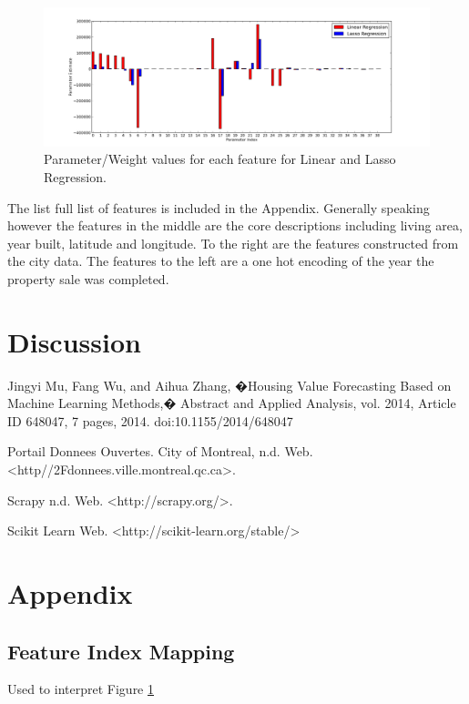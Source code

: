 \documentclass{acm_proc_article-sp}
\begin{document}
	 \begin{figure}[!htbp]
   		\centering
  		\includegraphics[width=\textwidth]{parameter_values.png}
    		\caption{Parameter/Weight values for each feature for Linear and Lasso Regression.}
    		\label{fig:feats}
	\end{figure}
	
	The list full list of features is included in the Appendix. Generally speaking however the features in the middle are the core descriptions including living area, year built, latitude and longitude. To the right are the features constructed from the city data. The features to the left are a one hot encoding of the year the property sale was completed.

\section{Discussion}

\begin{thebibliography}{9}

  Jingyi Mu, Fang Wu, and Aihua Zhang, �Housing Value Forecasting Based on Machine Learning Methods,� Abstract and Applied Analysis, vol. 2014, Article ID 648047, 7 pages, 2014. doi:10.1155/2014/648047
  
	Portail Donnees Ouvertes. City of Montreal, n.d. Web. <http//2Fdonnees.ville.montreal.qc.ca>.
	
	Scrapy n.d. Web. <http://scrapy.org/>.
	
 	Scikit Learn Web. <http://scikit-learn.org/stable/>

\end{thebibliography}

\section{Appendix}
\subsection{Feature Index Mapping}
Used to interpret Figure \ref{fig:feats} \\
\end{document}
